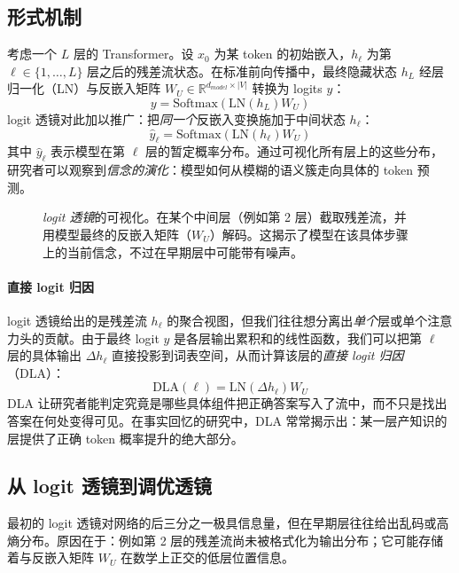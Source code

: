 \subsection{形式机制}
考虑一个 $L$ 层的 Transformer。设 $x_0$ 为某 token 的初始嵌入，$h_\ell$ 为第 $\ell \in \{1, \dots, L\}$ 层之后的残差流状态。在标准前向传播中，最终隐藏状态 $h_L$ 经层归一化（LN）与反嵌入矩阵 $W_U \in \mathbb{R}^{d_{model} \times |V|}$ 转换为 logits $y$：
\begin{equation}
    y = \text{Softmax}(\text{LN}(h_L) W_U)
\end{equation}
logit 透镜对此加以推广：把\emph{同一个}反嵌入变换施加于中间状态 $h_\ell$：
\begin{equation}
    \hat{y}_\ell = \text{Softmax}(\text{LN}(h_\ell) W_U)
\end{equation}
其中 $\hat{y}_\ell$ 表示模型在第 $\ell$ 层的暂定概率分布。通过可视化所有层上的这些分布，研究者可以观察到\emph{信念的演化}：模型如何从模糊的语义簇走向具体的 token 预测。
\begin{figure}[!ht]
    \centering
    \resizebox{0.65\textwidth}{!}{
        
    }
    \caption{\emph{logit 透镜}的可视化。在某个中间层（例如第 2 层）截取残差流，并用模型最终的反嵌入矩阵（$W_U$）解码。这揭示了模型在该具体步骤上的当前信念，不过在早期层中可能带有噪声。}
    \label{fig:logit_lens}
\end{figure}


\paragraph{直接 logit 归因}
logit 透镜给出的是残差流 $h_\ell$ 的聚合视图，但我们往往想分离出\emph{单个}层或单个注意力头的贡献。由于最终 logit $y$ 是各层输出累积和的线性函数，我们可以把第 $\ell$ 层的具体输出 $\Delta h_\ell$ 直接投影到词表空间，从而计算该层的\emph{直接 logit 归因}（DLA）：
\begin{equation}
    \text{DLA}(\ell) = \text{LN}(\Delta h_\ell) W_U
\end{equation}
DLA 让研究者能判定究竟是哪些具体组件把正确答案写入了流中，而不只是找出答案在何处变得可见。在事实回忆的研究中，DLA 常常揭示出：某一层产知识的层提供了正确 token 概率提升的绝大部分。

\subsection{从 logit 透镜到调优透镜}
最初的 logit 透镜对网络的后三分之一极具信息量，但在早期层往往给出乱码或高熵分布。原因在于：例如第 2 层的残差流尚未被格式化为输出分布；它可能存储着与反嵌入矩阵 $W_U$ 在数学上正交的低层位置信息。

